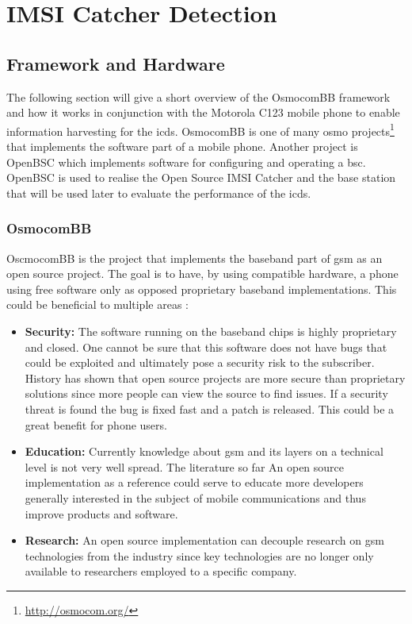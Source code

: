 \chapter{IMSI Catcher Detection}
\section{Framework and Hardware}
The following section will give a short overview of the OsmocomBB framework and how it works in conjunction with the Motorola C123 mobile phone to enable information harvesting for the \gls{icds}.
OsmocomBB is one of many \gls{osmo} projects\footnote{\url{http://osmocom.org/}} that implements the software part of a mobile phone.
Another project is OpenBSC which implements software for configuring and operating a \gls{bsc}.
OpenBSC is used to realise the Open Source IMSI Catcher \cite{dennis} and the base station that will be used later to evaluate the performance of the \gls{icds}.

\subsection{OsmocomBB}
OscmocomBB is the project that implements the baseband part of \gls{gsm} as an open source project.
The goal is to have, by using compatible hardware, a phone using free software only as opposed proprietary baseband implementations.
This could be beneficial to multiple areas \cite{osmo_rationale}:
\begin{itemize}
	\item \textbf{Security:} The software running on the baseband chips is highly proprietary and closed.
	One cannot be sure that this software does not have bugs that could be exploited and ultimately pose a security risk to the subscriber.
	History has shown that open source projects are more secure than proprietary solutions since more people can view the source to find issues.
	If a security threat is found the bug is fixed fast and a patch is released.
	This could be a great benefit for phone users.
	\item \textbf{Education:} Currently knowledge about \gls{gsm} and its layers on a technical level is not very well spread.
	The literature so far 
	An open source implementation as a reference could serve to educate more developers generally interested in the subject of mobile communications and thus improve products and software.
	\item \textbf{Research:} An open source implementation can decouple research on \gls{gsm} technologies from the industry since key technologies are no longer only available to researchers employed to a specific company.	
\end{itemize}

